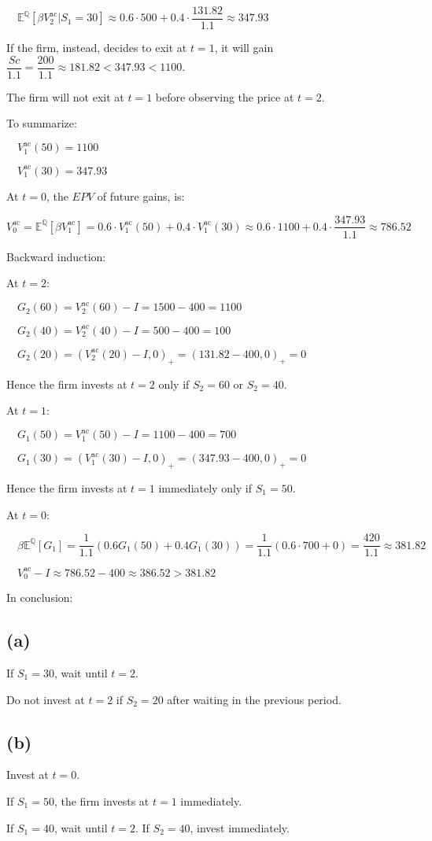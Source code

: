 \documentclass{article}
\begin{document}
$\quad \mathbb{E} ^{\mathbb{Q} }\left[\beta V^{\text{ac}}_{2}|S_{1}=30\right]\approx0.6\cdot500+0.4\cdot\dfrac{131.82}{1.1}\approx347.93$

If the firm, instead, decides to exit at $t=1$, it will gain $\dfrac{Sc}{1.1}=\dfrac{200}{1.1}\approx181.82<347.93<1100$.

The firm will not exit at $t=1$ before observing the price at $t=2$.

To summarize:

$\quad V^{\text{ac}}_{1}\left(50\right)=1100$

$\quad V^{\text{ac}}_{1}\left(30\right)=347.93$

At $t=0$, the $EPV$ of future gains, is:

$V^{\text{ac}}_{0}=\mathbb{E} ^{\mathbb{Q} }\left[\beta V^{\text{ac}}_{1}\right]=0.6\cdot V^{\text{ac}}_{1}\left(50\right)+0.4\cdot V^{\text{ac}}_{1}\left(30\right)\approx0.6\cdot1100+0.4\cdot\dfrac{347.93}{1.1}\approx786.52$

Backward induction:

At $t=2$:

$\quad G_{2}\left(60\right)=V^{\text{ac}}_{2}\left(60\right)-I=1500-400=1100$

$\quad G_{2}\left(40\right)=V^{\text{ac}}_{2}\left(40\right)-I=500-400=100$

$\quad G_{2}\left(20\right)=\left(V^{\text{ac}}_{2}\left(20\right)-I, 0\right)_{+}=\left(131.82-400, 0\right)_{+}=0$

Hence the firm invests at $t=2$ only if $S_{2}=60$ or $S_{2}=40$.

At $t=1$:

$\quad G_{1}\left(50\right)=V^{\text{ac}}_{1}\left(50\right)-I=1100-400=700$

$\quad G_{1}\left(30\right)=\left(V^{\text{ac}}_{1}\left(30\right)-I, 0\right)_{+}=\left(347.93-400, 0\right)_{+}=0$

Hence the firm invests at $t=1$ immediately only if $S_{1}=50$.

At $t=0$:

$\quad \beta\mathbb{E} ^{\mathbb{Q} }\left[G_{1}\right]=\dfrac{1}{1.1}\left(0.6G_{1}\left(50\right)+0.4G_{1}\left(30\right)\right)=\dfrac{1}{1.1}\left(0.6\cdot700+0\right)=\dfrac{420}{1.1}\approx381.82$

$\quad V^{\text{ac}}_{0}-I\approx786.52-400\approx386.52>381.82$

In conclusion:

\subsection*{(a)}

If $S_{1}=30$, wait until $t=2$. 

Do not invest at $t=2$ if $S_{2}=20$ after waiting in the previous period.

\subsection*{(b)}

Invest at $t=0$.

If $S_{1}=50$, the firm invests at $t=1$ immediately.

If $S_{1}=40$, wait until $t=2$. If $S_{2}=40$, invest immediately. 
\end{document}
